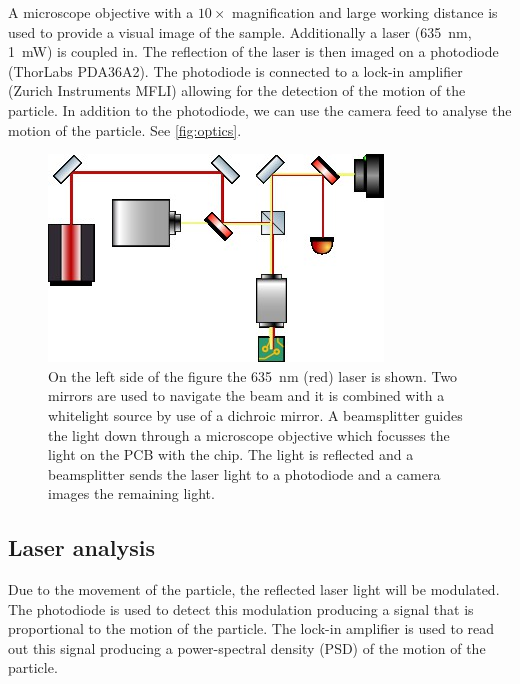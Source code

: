 A microscope objective with a $10\times$ magnification and large working distance is used to provide a visual image of the sample. Additionally a laser (\qty{635}{\nm}, \qty{1}{\milli\watt}) is coupled in. The reflection of the laser is then imaged on a photodiode (ThorLabs PDA36A2). The photodiode is connected to a lock-in amplifier (Zurich Instruments MFLI) allowing for the detection of the motion of the particle. In addition to the photodiode, we can use the camera feed to analyse the motion of the particle. See \autoref{fig:optics}.

\begin{figure}
    \centering
    \includegraphics{figures/optics.jpg}
    \caption{On the left side of the figure the \qty{635}{\nm} (red) laser is shown. Two mirrors are used to navigate the beam and it is combined with a whitelight source by use of a dichroic mirror. A beamsplitter guides the light down through a microscope objective which focusses the light on the PCB with the chip. The light is reflected and a beamsplitter sends the laser light to a photodiode and a camera images the remaining light.}
    \label{fig:optics}
\end{figure}

\subsection{Laser analysis}
Due to the movement of the particle, the reflected laser light will be modulated. The photodiode is used to detect this modulation producing a signal that is proportional to the motion of the particle. The lock-in amplifier is used to read out this signal producing a power-spectral density (PSD) of the motion of the particle.

